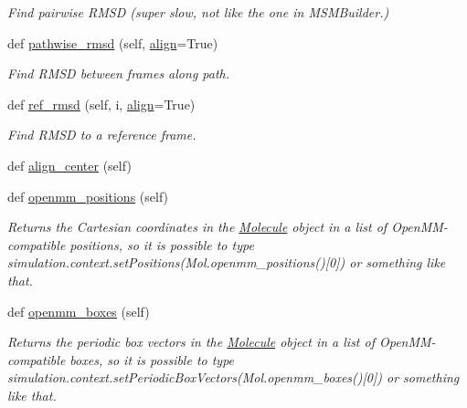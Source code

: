 \begin{DoxyCompactItemize}
\begin{DoxyCompactList}\small\item\em Find pairwise R\+M\+SD (super slow, not like the one in M\+S\+M\+Builder.) \end{DoxyCompactList}\item 
def \hyperlink{classsrc_1_1molecule_1_1Molecule_af1fbd83fc5bba35b5df496413410f84d}{pathwise\+\_\+rmsd} (self, \hyperlink{classsrc_1_1molecule_1_1Molecule_ad74d00f84b4b0b66b18de8a3f6b41c88}{align}=True)
\begin{DoxyCompactList}\small\item\em Find R\+M\+SD between frames along path. \end{DoxyCompactList}\item 
def \hyperlink{classsrc_1_1molecule_1_1Molecule_a029c994fba2c8388259bd062def28fde}{ref\+\_\+rmsd} (self, i, \hyperlink{classsrc_1_1molecule_1_1Molecule_ad74d00f84b4b0b66b18de8a3f6b41c88}{align}=True)
\begin{DoxyCompactList}\small\item\em Find R\+M\+SD to a reference frame. \end{DoxyCompactList}\item 
def \hyperlink{classsrc_1_1molecule_1_1Molecule_a42c302c3f922e6f89862f2e5d39514a6}{align\+\_\+center} (self)
\item 
def \hyperlink{classsrc_1_1molecule_1_1Molecule_a466ab9dea14be9117488c6198b0f77cd}{openmm\+\_\+positions} (self)
\begin{DoxyCompactList}\small\item\em Returns the Cartesian coordinates in the \hyperlink{classsrc_1_1molecule_1_1Molecule}{Molecule} object in a list of Open\+M\+M-\/compatible positions, so it is possible to type simulation.\+context.\+set\+Positions(Mol.\+openmm\+\_\+positions()\mbox{[}0\mbox{]}) or something like that. \end{DoxyCompactList}\item 
def \hyperlink{classsrc_1_1molecule_1_1Molecule_a4afda180689c9bfde319a025f96d4c0b}{openmm\+\_\+boxes} (self)
\begin{DoxyCompactList}\small\item\em Returns the periodic box vectors in the \hyperlink{classsrc_1_1molecule_1_1Molecule}{Molecule} object in a list of Open\+M\+M-\/compatible boxes, so it is possible to type simulation.\+context.\+set\+Periodic\+Box\+Vectors(Mol.\+openmm\+\_\+boxes()\mbox{[}0\mbox{]}) or something like that. \end{DoxyCompactList}\item 

\end{DoxyCompactItemize}
